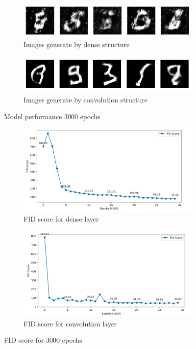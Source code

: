 \begin{figure}[H]
    \centering
    \begin{subfigure}[b]{\linewidth}
        \centering
        \includegraphics[width=0.7\linewidth]{./Images/generate_image_by_dense_layer.jpg}
        \caption{Images generate by dense structure}
        \label{fig:Dense}
    \end{subfigure}
    \vspace{0.05\linewidth} 
    \begin{subfigure}[b]{\linewidth}
        \centering
        \includegraphics[width=0.7\linewidth]{./Images/generate_image_by_Convolution_layer.jpg}
        \caption{Images generate by convolution structure}
        \label{fig:Conv2DTranspose}
    \end{subfigure}
    \caption{Model performance 3000 epochs}
    \label{fig:combined}
\end{figure}

\begin{figure}[H]
    \centering
    \begin{subfigure}[b]{\linewidth}
        \centering
        \includegraphics[width=0.7\linewidth]{./Images/fid_score_for_dense_layer.jpg}
        \caption{FID score for dense layer}
        \label{fig:Dense}
    \end{subfigure}
    \vspace{0.05\linewidth} 
    \begin{subfigure}[b]{\linewidth}
        \centering
        \includegraphics[width=0.7\linewidth]{./Images/fid_score_for_convolution_layer.jpg}
        \caption{FID score for convolution layer}
        \label{fig:Conv2DTranspose}
    \end{subfigure}
    \caption{FID score for 3000 epochs}
    \label{fig:combined}
\end{figure}


